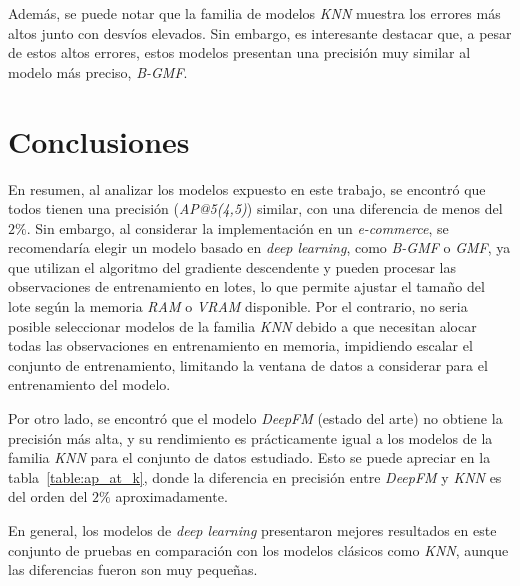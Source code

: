 \documentclass[11pt,a4paper,twoside]{thesis}
\begin{document}
Además, se puede notar que la familia de modelos \textit{KNN} muestra los
errores más altos junto con desvíos elevados. Sin embargo, es interesante
destacar que, a pesar de estos altos errores, estos modelos presentan una
precisión muy similar al modelo más preciso, \textit{B-GMF}.

\chapter{Conclusiones}

En resumen, al analizar los modelos expuesto en este trabajo, se encontró que
todos tienen una precisión (\textit{AP@5(4,5)}) similar, con una diferencia de
menos del $2\%$. Sin embargo, al considerar la implementación en un
\textit{e-commerce}, se recomendaría elegir un modelo basado en \textit{deep
	learning}, como \textit{B-GMF} o \textit{GMF}, ya que utilizan el algoritmo del
gradiente descendente y pueden procesar las observaciones de entrenamiento en
lotes, lo que permite ajustar el tamaño del lote según la memoria \textit{RAM}
o \textit{VRAM} disponible. Por el contrario, no seria posible seleccionar
modelos de la familia \textit{KNN} debido a que necesitan alocar todas las
observaciones en entrenamiento en memoria, impidiendo escalar el conjunto de
entrenamiento, limitando la ventana de datos a considerar para el entrenamiento
del modelo.

Por otro lado, se encontró que el modelo \textit{DeepFM} (estado del arte) no
obtiene la precisión más alta, y su rendimiento es prácticamente igual a los
modelos de la familia \textit{KNN} para el conjunto de datos estudiado. Esto se
puede apreciar en la tabla~\ref{table:ap_at_k}, donde la diferencia en
precisión entre \textit{DeepFM} y \textit{KNN} es del orden del $2\%$
aproximadamente.

En general, los modelos de \textit{deep learning} presentaron mejores
resultados en este conjunto de pruebas en comparación con los modelos clásicos
como \textit{KNN}, aunque las diferencias fueron son muy pequeñas.



\renewcommand{\bibname}{Referencias}
\end{document}
